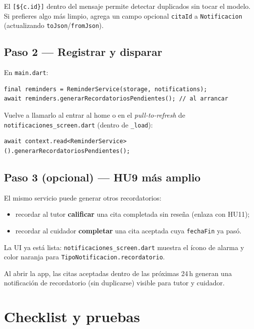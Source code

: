 \documentclass[11pt,a4paper]{article}
\begin{document}
\begin{nota}
El \texttt{[\$\{c.id\}]} dentro del mensaje permite detectar duplicados sin tocar
el modelo. Si prefieres algo más limpio, agrega un campo opcional \texttt{citaId}
a \texttt{Notificacion} (actualizando \texttt{toJson}/\texttt{fromJson}).
\end{nota}

\subsection{Paso 2 — Registrar y disparar}
En \texttt{main.dart}:
\begin{lstlisting}
final reminders = ReminderService(storage, notifications);
await reminders.generarRecordatoriosPendientes(); // al arrancar
\end{lstlisting}
Vuelve a llamarlo al entrar al home o en el \emph{pull-to-refresh} de
\texttt{notificaciones\_screen.dart} (dentro de \texttt{\_load}):
\begin{lstlisting}
await context.read<ReminderService>().generarRecordatoriosPendientes();
\end{lstlisting}

\subsection{Paso 3 (opcional) — HU9 más amplio}
El mismo servicio puede generar otros recordatorios:
\begin{itemize}
  \item recordar al tutor \textbf{calificar} una cita completada sin reseña (enlaza con HU11);
  \item recordar al cuidador \textbf{completar} una cita aceptada cuya \texttt{fechaFin} ya pasó.
\end{itemize}
La UI ya está lista: \texttt{notificaciones\_screen.dart} muestra el ícono de
alarma y color naranja para \texttt{TipoNotificacion.recordatorio}.

\begin{listo}
Al abrir la app, las citas aceptadas dentro de las próximas 24\,h generan una
notificación de recordatorio (sin duplicarse) visible para tutor y cuidador.
\end{listo}

\section{Checklist y pruebas}
\end{document}
